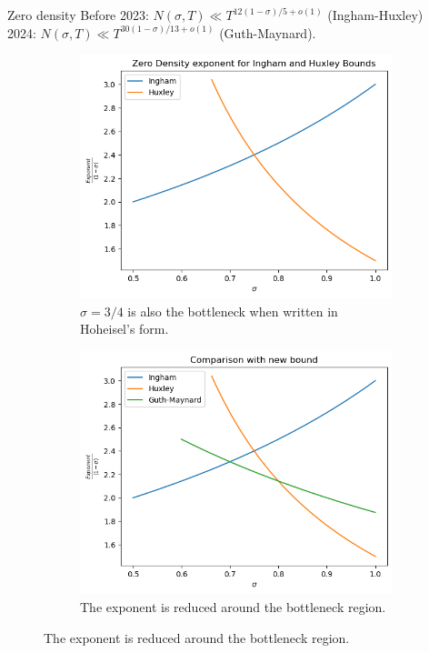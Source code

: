 \documentclass[aspectratio=169,xcolor=dvipsnames]{beamer}
\begin{document}
\begin{frame}{Zero density}
Before 2023: $N(\sigma,T)\ll T^{12(1-\sigma)/5 + o(1)}$ (Ingham-Huxley)\\
2024: $N(\sigma,T)\ll T^{30(1-\sigma)/13+o(1)}$ (Guth-Maynard).
\begin{figure}[h]
    \centering
    \begin{subfigure}{0.4\textwidth}
        \includegraphics[width=\textwidth]{inghamhuxley2.png}
        \caption{$\sigma=3/4$ is also the bottleneck when written in Hoheisel's form.}
    \end{subfigure}
    \centering
    \begin{subfigure}{0.4\textwidth}
        \includegraphics[width=\textwidth]{gm_2.png}
        \caption{The exponent is reduced around the bottleneck region.}
    \end{subfigure}
\end{figure}
\end{frame}
\end{document}

